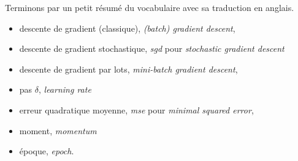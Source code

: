 \documentclass[11pt,class=report,crop=false]{standalone}
\begin{document}
Terminons par un petit résumé du vocabulaire avec sa traduction en anglais.
\begin{itemize}
 \item descente de gradient (classique), \emph{(batch) gradient descent},
 \item descente de gradient stochastique, \emph{sgd} pour \emph{stochastic gradient descent}
 \item descente de gradient par lots, \emph{mini-batch gradient descent},
 \item pas $\delta$, \emph{learning rate}
 \item erreur quadratique moyenne, \emph{mse} pour \emph{minimal squared error},
 \item moment, \emph{momentum}
 \item époque, \emph{epoch}.
 \end{itemize}  
\end{document}

